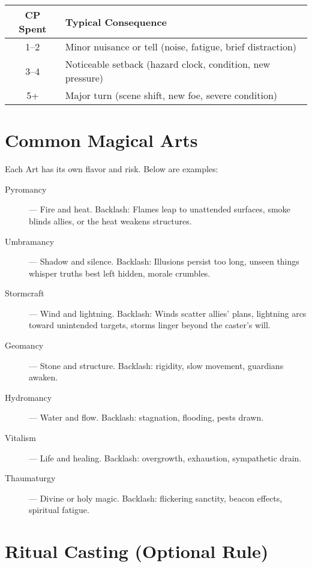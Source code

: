 \begin{center}
\begin{tabular}{cl}
\toprule
\textbf{CP Spent} & \textbf{Typical Consequence} \\
\midrule
1–2 & Minor nuisance or tell (noise, fatigue, brief distraction) \\
3–4 & Noticeable setback (hazard clock, condition, new pressure) \\
5+ & Major turn (scene shift, new foe, severe condition) \\
\bottomrule
\end{tabular}
\end{center}

\section{Common Magical Arts}

Each Art has its own flavor and risk. Below are examples:

\begin{description}
  \item[Pyromancy]  — Fire and heat. Backlash: Flames leap to unattended surfaces, smoke blinds allies, or the heat weakens structures.
  \item[Umbramancy]  — Shadow and silence. Backlash: Illusions persist too long, unseen things whisper truths best left hidden, morale crumbles.
  \item[Stormcraft]  — Wind and lightning. Backlash: Winds scatter allies' plans, lightning arcs toward unintended targets, storms linger beyond the caster's will.
  \item[Geomancy]  — Stone and structure. Backlash: rigidity, slow movement, guardians awaken.
  \item[Hydromancy]  — Water and flow. Backlash: stagnation, flooding, pests drawn.
  \item[Vitalism]  — Life and healing. Backlash: overgrowth, exhaustion, sympathetic drain.
  \item[Thaumaturgy]  — Divine or holy magic. Backlash: flickering sanctity, beacon effects, spiritual fatigue.
\end{description}

\section{Ritual Casting (Optional Rule)}

